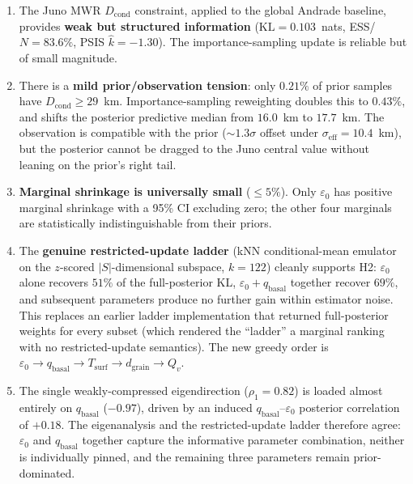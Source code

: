 \documentclass[11pt,a4paper]{article}
\begin{document}
\begin{enumerate}
\item The Juno MWR $D_\mathrm{cond}$ constraint, applied to the global Andrade
  baseline, provides \textbf{weak but structured information}
  ($\mathrm{KL} = 0.103$~nats, ESS/$N = 83.6\%$, PSIS $\hat{k} = -1.30$).
  The importance-sampling update is reliable but of small magnitude.

\item There is a \textbf{mild prior/observation tension}: only $0.21\%$ of
  prior samples have $D_\mathrm{cond} \geq 29$~km.  Importance-sampling
  reweighting doubles this to $0.43\%$, and shifts the posterior predictive
  median from $16.0$~km to $17.7$~km.  The observation is compatible with the
  prior ($\sim 1.3\sigma$ offset under $\sigma_\mathrm{eff} = 10.4$~km), but
  the posterior cannot be dragged to the Juno central value without leaning on
  the prior's right tail.

\item \textbf{Marginal shrinkage is universally small} ($\leq 5\%$).  Only
  $\varepsilon_0$ has positive marginal shrinkage with a 95\% CI excluding zero;
  the other four marginals are statistically indistinguishable from their priors.

\item The \textbf{genuine restricted-update ladder} (kNN conditional-mean
  emulator on the $z$-scored $|S|$-dimensional subspace, $k = 122$) cleanly
  supports H2: $\varepsilon_0$ alone recovers $51\%$ of the full-posterior KL,
  $\varepsilon_0 + q_\mathrm{basal}$ together recover $69\%$, and subsequent
  parameters produce no further gain within estimator noise.  This replaces
  an earlier ladder implementation that returned full-posterior weights for
  every subset (which rendered the ``ladder'' a marginal ranking with no
  restricted-update semantics).  The new greedy order is
  $\varepsilon_0 \to q_\mathrm{basal} \to T_\mathrm{surf} \to d_\mathrm{grain}
  \to Q_v$.

\item The single weakly-compressed eigendirection ($\rho_1 = 0.82$) is loaded
  almost entirely on $q_\mathrm{basal}$ ($-0.97$), driven by an induced
  $q_\mathrm{basal}$--$\varepsilon_0$ posterior correlation of $+0.18$.  The
  eigenanalysis and the restricted-update ladder therefore agree:
  $\varepsilon_0$ and $q_\mathrm{basal}$ together capture the informative
  parameter combination, neither is individually pinned, and the remaining
  three parameters remain prior-dominated.


\end{enumerate}
\end{document}
